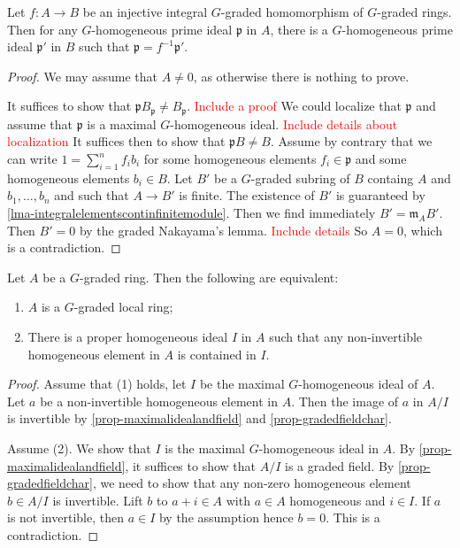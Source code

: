 \begin{proposition}\label{prop-integralextprimelift}
    Let $f:A\rightarrow B$ be an injective integral $G$-graded homomorphism of $G$-graded rings. Then for any $G$-homogeneous prime ideal $\mathfrak{p}$ in $A$, there is a $G$-homogeneous prime ideal $\mathfrak{p}'$ in $B$ such that $\mathfrak{p}=f^{-1}\mathfrak{p}'$.
\end{proposition}
\begin{proof}
    We may assume that $A\neq 0 $, as otherwise there is nothing to prove.

    It suffices to show that $\mathfrak{p}B_{\mathfrak{p}}\neq B_{\mathfrak{p}}$. \textcolor{red}{Include a proof}
    We could localize that $\mathfrak{p}$ and assume that $\mathfrak{p}$ is a maximal $G$-homogeneous ideal. \textcolor{red}{Include details about localization} It suffices then to show that $\mathfrak{p}B\neq B$. Assume by contrary that we can write $1=\sum_{i=1}^n f_i b_i$ for some homogeneous elements $f_i\in \mathfrak{p}$ and some homogeneous elements $b_i\in B$. Let $B'$ be a $G$-graded subring of $B$ containg $A$ and $b_1,\ldots,b_n$ and such that $A\rightarrow B'$ is finite. The existence of $B'$ is guaranteed by \cref{lma-integralelementscontinfinitemodule}. Then we find immediately $B'=\mathfrak{m}_AB'$. Then $B'=0$ by the graded Nakayama's lemma. \textcolor{red}{Include details} So $A=0$, which is a contradiction.
\end{proof}

\begin{lemma}\label{lma-rhoconditionimplygraded}
    Let $A$ be a $G$-graded ring. Then the following are equivalent:
    \begin{enumerate}
        \item $A$ is a $G$-graded local ring;
        \item There is a proper homogeneous ideal $I$ in $A$ such that any non-invertible homogeneous element in $A$ is contained in $I$.
    \end{enumerate}
\end{lemma}
\begin{proof}
    Assume that (1) holds, let $I$ be the maximal $G$-homogeneous ideal of $A$. Let $a$ be a non-invertible homogeneous element in $A$. Then the image of $a$ in $A/I$ is invertible by \cref{prop-maximalidealandfield} and \cref{prop-gradedfieldchar}.

    Assume (2). We show that $I$ is the maximal $G$-homogeneous ideal in $A$. By \cref{prop-maximalidealandfield}, it suffices to show that $A/I$ is a graded field. By \cref{prop-gradedfieldchar}, we need to show that any non-zero homogeneous element $b\in A/I$ is invertible. Lift $b$ to $a+i\in A$ with $a\in A$ homogeneous and $i\in I$. If $a$ is not invertible, then $a\in I$ by the assumption hence $b=0$. This is a contradiction.
\end{proof}



